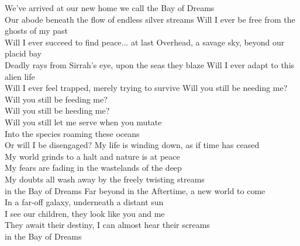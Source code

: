\clearpage
{}

We've arrived at our new home we call the Bay of Dreams\\
Our abode beneath the flow of endless silver streams
\hop
Will I ever be free from the ghosts of my past\\
Will I ever succeed to find peace... at last
\hop
Overhead, a savage sky, beyond our placid bay\\
Deadly rays from Sirrah's eye, upon the seas they blaze
\hop
Will I ever adapt to this alien life\\
Will I ever feel trapped, merely trying to survive
\hops
Will you still be needing me?\\
Will you still be feeding me?\\
Will you still be heeding me?\\
Will you still let me serve when you mutate \\
Into the species roaming these oceans\\
Or will I be disengaged?
\hops
My life is winding down, as if time has ceased\\
My world grinds to a halt and nature is at peace\\
My fears are fading in the wastelands of the deep\\
My doubts all wash away by the freely twisting streams\\
in the Bay of Dreams
\hop
Far beyond in the Aftertime, a new world to come\\
In a far-off galaxy, underneath a distant sun\\
I see our children, they look like you and me\\
They await their destiny, I can almost hear their screams\\
in the Bay of Dreams

\clearpage
{}

